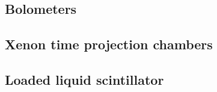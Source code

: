 \subsection{Bolometers} \label{subsec:bolometers}


\subsection{Xenon time projection chambers} 
\label{subsec:XeTPCs}


\subsection{Loaded liquid scintillator} 
\label{subsec:liquid_scint}



% 

% 

% 

%  

%  

% 

% 

